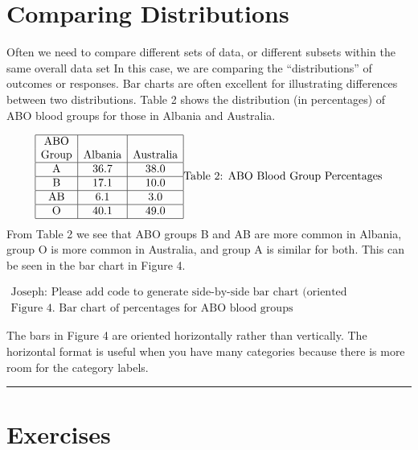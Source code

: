 \documentclass[
]{book}
\begin{document}
\hypertarget{comparing-distributions}{%
\section{Comparing Distributions}\label{comparing-distributions}}

Often we need to compare different sets of data, or different subsets
within the same overall data set In this case, we are comparing the
``distributions'' of outcomes or responses. Bar charts are
often excellent for illustrating differences between two distributions. Table
2 shows the distribution (in percentages) of ABO blood groups for those in
Albania and Australia.

\[
\begin{array}{|c|c|c|} \hline
\text{ABO} && \\
\text{Group} & \text{Albania} & \text{Australia} \\ \hline
\mathrm{A} & 36.7 & 38.0 \\  \hline
\mathrm{B} & 17.1 & 10.0 \\  \hline
\mathrm{AB} & 6.1 & 3.0 \\  \hline
\mathrm{O} & 40.1 & 49.0 \\  \hline
\end{array}\\
\mbox{Table 2: ABO Blood Group Percentages}
\]
From Table 2 we see that ABO groups B and AB are more common in Albania,
group O is more common in Australia, and group A is similar for both.
This can be seen in the bar chart in Figure 4.

\[
\begin{array}{c}
\mbox{Joseph: Please add code to generate side-by-side bar chart 
(oriented horizontally)} \\[.1in]
\mbox{Figure 4. Bar chart of percentages for ABO blood groups}
\end{array}
\]

The bars in Figure 4 are oriented horizontally rather than vertically. The
horizontal format is useful when you have many categories because there is more
room for the category labels.

\begin{center}\rule{0.5\linewidth}{0.5pt}\end{center}

\hypertarget{exercises-2}{%
\section{Exercises}\label{exercises-2}}
\end{document}
